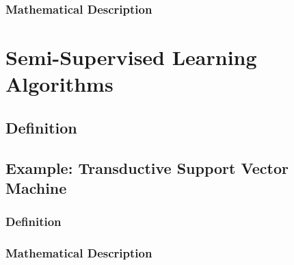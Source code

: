 \documentclass{article}
\begin{document}
\subsubsection{Mathematical Description}

\section{Semi-Supervised Learning Algorithms}
\subsection{Definition}
\subsection{Example: Transductive Support Vector Machine}
\subsubsection{Definition}
\subsubsection{Mathematical Description}


\begin{thebibliography}{9}


\end{thebibliography}
\end{document}
